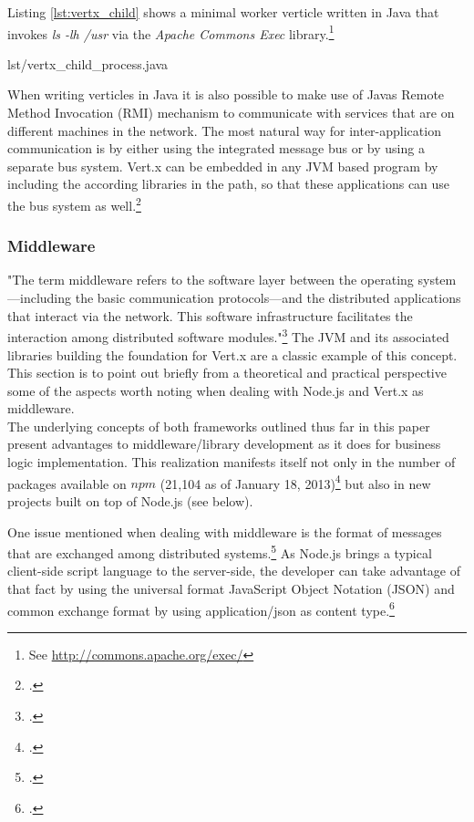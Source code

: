 Listing \ref{lst:vertx_child} shows a minimal worker verticle written in
Java that invokes \textit{ls -lh /usr} via the \textit{Apache Commons Exec}
library.\footnote{See \url{http://commons.apache.org/exec/}}

%
{lst/vertx_child_process.java}

When writing verticles in Java it is also possible to make use of Javas Remote
Method Invocation (RMI) mechanism to communicate with services that are on different
machines in the network.
The most natural way for inter-application communication is by either using the
integrated message bus or by using a separate bus system.
Vert.x can be embedded in any JVM based program by including the according
libraries in the path, so that these applications can use the bus system as
well.\footcite[Cf.][]{vertx_2012}

\subsubsection{Middleware}
\label{middleware}
"The term middleware refers to the software layer between the operating system—including the basic communication protocols—and the distributed applications that interact via the network. This software infrastructure facilitates the
interaction among distributed software modules."\footcite[]{Geihs_2001} The JVM and its associated libraries building the foundation for Vert.x are a classic example of this concept. This section is to point out briefly from a theoretical and practical perspective some of the aspects worth noting when dealing with Node.js and Vert.x as middleware.\\

The underlying concepts of both frameworks outlined thus far in this paper present advantages to middleware/library development as it does for business logic implementation. This realization manifests itself not only in the number of packages available on $npm$ (21,104 as of January 18, 2013)\footcite[Cf.][]{node_packages} but also in new projects built on top of Node.js (see below).

One issue mentioned when dealing with middleware is the format of messages that are exchanged among distributed systems.\footcite[149]{Tannenbaum_2007} As Node.js brings a typical client-side script language to the server-side, the developer can take advantage of that fact by using the universal format JavaScript Object Notation (JSON) and common exchange format by using application/json as content type.\footcite[Cf.][]{rfc4627}\\


